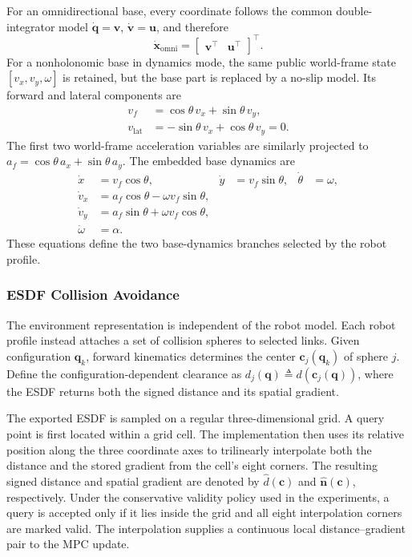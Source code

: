 \documentclass[conference]{IEEEtran}
\newcommand{\vect}[1]{\boldsymbol{#1}}
\begin{document}
For an omnidirectional base, every coordinate follows the common
double-integrator model $\dot{\vect{q}}=\vect{v}$,
$\dot{\vect{v}}=\vect{u}$, and therefore
\begin{equation}
\dot{\vect{x}}_{\mathrm{omni}}
=\begin{bmatrix}\vect{v}^{\top}&\vect{u}^{\top}\end{bmatrix}^{\!\top}.
\label{eq:omni-state-dynamics}
\end{equation}
For a nonholonomic base in dynamics mode, the same
public world-frame state $[v_x,v_y,\omega]$ is retained, but the base part is
replaced by a no-slip model.  Its forward and lateral components are
\begin{align}
v_f &= \cos\theta\,v_x+\sin\theta\,v_y, \\
v_{\mathrm{lat}} &= -\sin\theta\,v_x+\cos\theta\,v_y=0. \label{eq:no-slip}
\end{align}
The first two world-frame acceleration variables are similarly projected to
$a_f=\cos\theta\,a_x+\sin\theta\,a_y$.  The embedded base dynamics are
\begin{align}
\dot{x}&=v_f\cos\theta,&
\dot{y}&=v_f\sin\theta,&
\dot{\theta}&=\omega,\\
\dot{v}_x&=a_f\cos\theta-\omega v_f\sin\theta,\\
\dot{v}_y&=a_f\sin\theta+\omega v_f\cos\theta,\\
\dot{\omega}&=\alpha. \label{eq:unicycle}
\end{align}
These equations define the two base-dynamics branches selected by the robot
profile.

\subsubsection{ESDF Collision Avoidance}

The environment representation is independent of the robot model.  Each robot
profile instead attaches a set of collision spheres to selected links.  Given
configuration $\vect{q}_k$, forward kinematics determines the center
$\vect{c}_j(\vect{q}_k)$ of sphere $j$.  Define the configuration-dependent
clearance as $d_j(\vect{q})\triangleq d(\vect{c}_j(\vect{q}))$, where the ESDF
returns both the signed distance and its spatial gradient.

The exported ESDF is sampled on a regular three-dimensional grid.  A query
point is first located within a grid cell.  The implementation then uses its
relative position along the three coordinate axes to trilinearly interpolate
both the distance and the stored gradient from the cell's eight corners.  The
resulting signed distance and spatial gradient are denoted by
$\widehat d(\vect{c})$ and $\widehat{\vect{n}}(\vect{c})$, respectively.  Under
the conservative validity policy used in the experiments, a query is accepted
only if it lies inside the grid and all eight interpolation corners are marked
valid.  The interpolation supplies a continuous local distance--gradient pair
to the MPC update.
\end{document}
